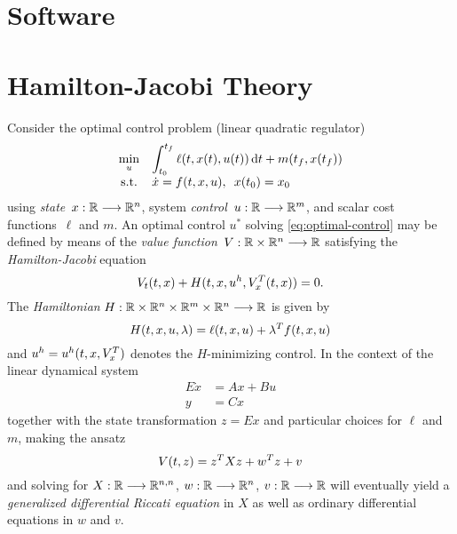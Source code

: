 \section{Software}

\cite{DrWatson}
\cite{Makie}

\section{Hamilton-Jacobi Theory}

Consider the optimal control problem
(linear quadratic regulator)
\begin{equation}
  \everymath{\displaystyle}
  \begin{array}{cl}
    \min_u & \int_{t_0}^{t_f} \ell(t, x(t), u(t)) \dt + m(t_f, x(t_f)) \\
    \text{s.t.} & \dot{x} = f(t,x,u), \enspace x(t_0) = x_0
  \end{array}
  \label{eq:optimal-control}
\end{equation}
using \emph{state}~$x:\mathbb{R}\longrightarrow\mathbb{R}^n$, system \emph{control}~$u:\mathbb{R}\longrightarrow\mathbb{R}^m$,
and scalar cost functions~$\ell$ and $m$.
An optimal control $u^*$ solving \eqref{eq:optimal-control} may be defined by means of the
\emph{value function}~$V:\mathbb{R}\times\mathbb{R}^n\longrightarrow\mathbb{R}$ satisfying the \emph{Hamilton-Jacobi} equation
\begin{equation}
  V_t(t,x) + H(t,x,u^h,V_x^T(t,x)) = 0.
  \label{eq:hamilton-jacobi}
\end{equation}
The \emph{Hamiltonian} $H:\mathbb{R}\times\mathbb{R}^n\times\mathbb{R}^m\times\mathbb{R}^n\longrightarrow\mathbb{R}$ is given by
\begin{equation}
  H(t,x,u,\lambda) = \ell(t,x,u) + \lambda^T f(t,x,u)
\end{equation}
and $u^h = u^h(t,x,V_x^T)$ denotes the $H$-minimizing control.
In the context of the linear dynamical system
\begin{equation}
  \begin{aligned}
    E\dot{x} &= Ax + Bu \\
    y &= Cx
  \end{aligned}
\end{equation}
together with the state transformation $z=Ex$ and particular choices for $\ell$ and $m$,
making the ansatz
\begin{equation}
  V(t,z) = z^T Xz + w^T z + v
\end{equation}
and solving for $X:\mathbb{R}\longrightarrow\mathbb{R}^{n,n}$, $w:\mathbb{R}\longrightarrow\mathbb{R}^n$, $v:\mathbb{R}\longrightarrow\mathbb{R}$ will eventually
yield a \emph{generalized differential Riccati equation} in $X$ as well as
ordinary differential equations in $w$ and $v$.
\cite{Locatelli2011}

